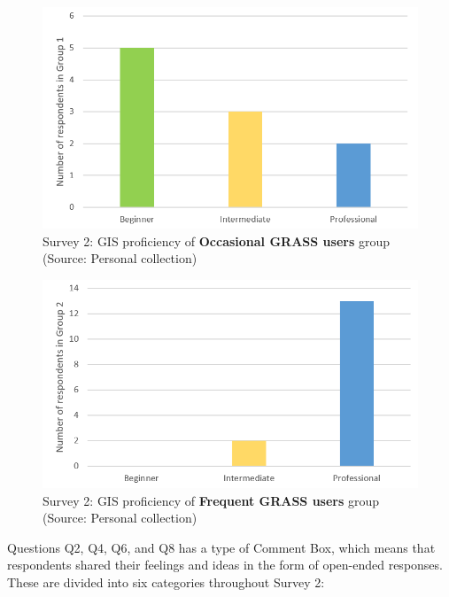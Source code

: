 \documentclass[a4paper,10pt,twoside]{article}
\begin{document}
\vspace{0.3cm}
\begin{figure}[hbt!] 
\begin{center}
\includegraphics[width=11.5cm]{../surveys/analyzed_data/survey2_respondents_group1.png} 
\caption[Survey 2: GIS proficiency of \textbf{Occasional GRASS users} group]{Survey 2: GIS proficiency of \textbf{Occasional GRASS users} group (Source: Personal collection)}
\label{fig:survey2_respondents_group1}
\end{center}
\end{figure}

\begin{figure}[hbt!] 
\begin{center}
\includegraphics[width=11.5cm]{../surveys/analyzed_data/survey2_respondents_group2.png} 
\caption[Survey 2: GIS proficiency of \textbf{Frequent GRASS users} group]{Survey 2: GIS proficiency of \textbf{Frequent GRASS users} group (Source: Personal collection)}
\label{fig:survey2_respondents_group2}
\end{center}
\end{figure}

\newpage
\noindent Questions Q2, Q4, Q6, and Q8 has a type of Comment Box, which means that respondents shared their feelings and ideas in the form of open-ended responses. These are divided into six categories throughout Survey 2:
\end{document}
